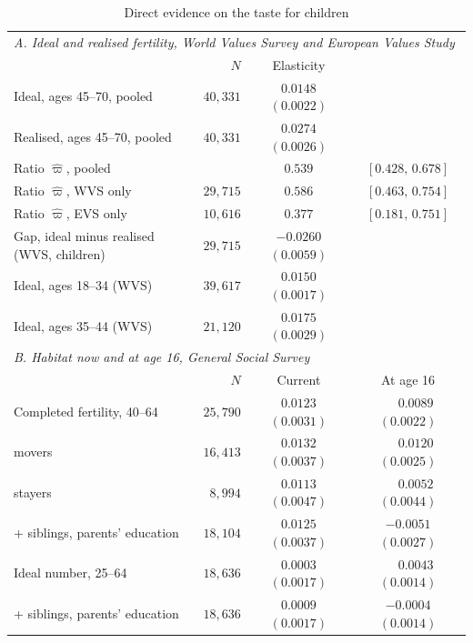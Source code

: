 \documentclass[11pt]{article}
\begin{document}
\begin{table}[h!]\centering
\begin{threeparttable}
\caption{Direct evidence on the taste for children}
\label{tab:prefs}
\footnotesize\setlength{\tabcolsep}{3.5pt}
\begin{tabular}{lrcc}
\toprule
\multicolumn{4}{l}{\emph{A. Ideal and realised fertility, World Values Survey and European Values Study}}\\
& $N$ & Elasticity & \\
\midrule
Ideal, ages 45--70, pooled                & $40{,}331$ & $0.0148$ $(0.0022)$ & \\
Realised, ages 45--70, pooled             & $40{,}331$ & $0.0274$ $(0.0026)$ & \\
Ratio $\hat\varpi$, pooled                  &            & $0.539$ & $[0.428,\,0.678]$\\
Ratio $\hat\varpi$, WVS only                & $29{,}715$ & $0.586$ & $[0.463,\,0.754]$\\
Ratio $\hat\varpi$, EVS only                & $10{,}616$ & $0.377$ & $[0.181,\,0.751]$\\
Gap, ideal minus realised (WVS, children) & $29{,}715$ & $-0.0260$ $(0.0059)$ & \\
Ideal, ages 18--34 (WVS)                  & $39{,}617$ & $0.0150$ $(0.0017)$ & \\
Ideal, ages 35--44 (WVS)                  & $21{,}120$ & $0.0175$ $(0.0029)$ & \\
\midrule
\multicolumn{4}{l}{\emph{B. Habitat now and at age 16, General Social Survey}}\\
& $N$ & Current & At age 16\\
\midrule
Completed fertility, 40--64               & $25{,}790$ & $0.0123$ $(0.0031)$ & $\phantom{-}0.0089$ $(0.0022)$\\
\quad movers                             & $16{,}413$ & $0.0132$ $(0.0037)$ & $\phantom{-}0.0120$ $(0.0025)$\\
\quad stayers                            & $8{,}994$  & $0.0113$ $(0.0047)$ & $\phantom{-}0.0052$ $(0.0044)$\\
\quad + siblings, parents' education     & $18{,}104$ & $0.0125$ $(0.0037)$ & $-0.0051$ $(0.0027)$\\
Ideal number, 25--64                     & $18{,}636$ & $0.0003$ $(0.0017)$ & $\phantom{-}0.0043$ $(0.0014)$\\
\quad + siblings, parents' education     & $18{,}636$ & $0.0009$ $(0.0017)$ & $-0.0004$ $(0.0014)$\\

\end{tabular}
\end{threeparttable}
\end{table}
\end{document}
